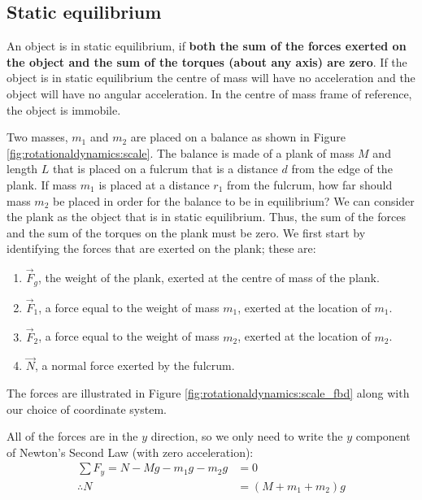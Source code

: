 \subsection{Static equilibrium}
An object is in static equilibrium, if \textbf{both the sum of the forces exerted on the object and the sum of the torques (about any axis) are zero}. If the object is in static equilibrium the centre of mass will have no acceleration and the object will have no angular acceleration. In the centre of mass frame of reference, the object is immobile. 
\begin{example}{ Two masses, $m_1$ and $m_2$ are placed on a balance as shown in Figure \ref{fig:rotationaldynamics:scale}. The balance is made of a plank of mass $M$ and length $L$ that is placed on a fulcrum that is a distance $d$ from the edge of the plank. If mass $m_1$ is placed at a distance $r_1$ from the fulcrum, how far should mass $m_2$ be placed in order for the balance to be in equilibrium?}
We can consider the plank as the object that is in static equilibrium. Thus, the sum of the forces and the sum of the torques on the plank must be zero. We first start by identifying the forces that are exerted on the plank; these are:
\begin{enumerate}
\item $\vec F_g$, the weight of the plank, exerted at the centre of mass of the plank.
\item $\vec F_1$, a force equal to the weight of mass $m_1$, exerted at the location of $m_1$. 
\item $\vec F_2$, a force equal to the weight of mass $m_2$, exerted at the location of $m_2$.
\item $\vec N$, a normal force exerted by the fulcrum.
\end{enumerate} 
The forces are illustrated in Figure \ref{fig:rotationaldynamics:scale_fbd} along with our choice of coordinate system. 

All of the forces are in the $y$ direction, so we only need to write the $y$ component of Newton's Second Law (with zero acceleration):
\begin{align*}
\sum F_y = N - Mg -m_1g - m_2 g &=0\\
\therefore N &= (M+m_1+m_2) g
\end{align*}


\end{example}

